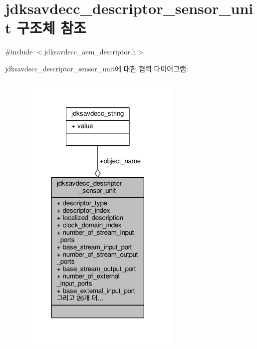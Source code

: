 \hypertarget{structjdksavdecc__descriptor__sensor__unit}{}\section{jdksavdecc\+\_\+descriptor\+\_\+sensor\+\_\+unit 구조체 참조}
\label{structjdksavdecc__descriptor__sensor__unit}


{\ttfamily \#include $<$jdksavdecc\+\_\+aem\+\_\+descriptor.\+h$>$}



jdksavdecc\+\_\+descriptor\+\_\+sensor\+\_\+unit에 대한 협력 다이어그램\+:
\nopagebreak
\begin{figure}[H]
\begin{center}
\leavevmode
\includegraphics[width=219pt]{structjdksavdecc__descriptor__sensor__unit__coll__graph}
\end{center}
\end{figure}

